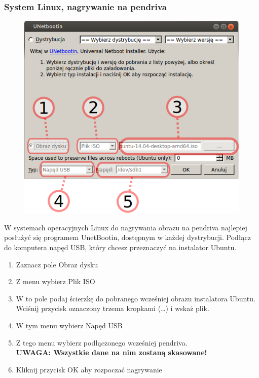 \subsubsection{System Linux, nagrywanie na pendriva}
\begin{figure}
		\includegraphics[width=\linewidth]{images/instalacja_nagrywanie_obrazu_linux.png}
\end{figure}
W systemach operacyjnych Linux do nagrywania obrazu na pendriva najlepiej posłużyć się programem UnetBootin, dostępnym w każdej dystrybucji. Podłącz do komputera napęd USB, który chcesz przeznaczyć na instalator Ubuntu.
\begin{enumerate}
\item Zaznacz pole Obraz dysku
\item Z menu wybierz Plik ISO
\item W to pole podaj ścierzkę do pobranego wcześniej obrazu instalatora Ubuntu. Wciśnij przycisk oznaczony trzema kropkami (\ldots) i wskaż plik.
\item W tym menu wybierz Napęd USB
\item Z tego menu wybierz podłączonego wcześniej pendriva.\\
\textbf{UWAGA: Wszystkie dane na nim zostaną skasowane!}
\item Kliknij przycisk OK aby rozpoczać nagrywanie
\end{enumerate}
\clearpage
